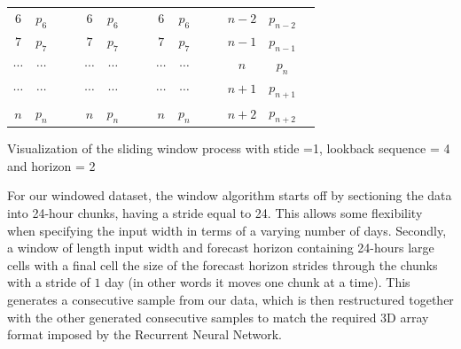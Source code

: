 \documentclass
[twocolumn,
secnumarabic,
nobibnotes,
aps,
prl,
reprint,
groupedaddress,
amsmath,
amssymb,
]{revtex4-2}
\begin{document}
\begin{center}
\begin{tabular}{|c|c|cc|c|c|cc|c|c|cc|c|c|c}
    $6$        & $p_6$                         &                &  & $6$        & \cellcolor[HTML]{EB7D7D}$p_6$ &                &  & $6$        & \cellcolor[HTML]{EB7D7D}$p_6$ &       &  & ${n-2}$    & \cellcolor[HTML]{C0C0C0}$p_{n-2}$ &       \\ \cline{1-2} \cline{5-6} \cline{9-10} \cline{13-14}
    $7$        & $p_7$                         &                &  & $7$        & $p_7$                         &                &  & $7$        & \cellcolor[HTML]{EB7D7D}$p_7$ &                &  & ${n-1}$    & \cellcolor[HTML]{C0C0C0}$p_{n-1}$ &                \\ \cline{1-2} \cline{5-6} \cline{9-10} \cline{13-14}
    $\cdots$            & $\cdots$                             &                &  & $\cdots$            & $\cdots$                             &                &  & $\cdots$            & $\cdots$                             &                &  & ${n}$    & \cellcolor[HTML]{C0C0C0}$p_{n}$ &       \\ \cline{1-2} \cline{5-6} \cline{9-10} \cline{13-14}
    $\cdots$            & $\cdots$                             &                &  & $\cdots$            & $\cdots$                             &                &  & $\cdots$            & $\cdots$                             &                &  & ${n+1}$    & \cellcolor[HTML]{EB7D7D}$p_{n+1}$ &  \\ \cline{1-2} \cline{5-6} \cline{9-10} \cline{13-14}
    $n$        & $p_n$                         &                &  & $n$        & $p_n$                         &                &  & $n$        & $p_n$                         &                &  & $n+2$        & \cellcolor[HTML]{EB7D7D}$p_{n+2}$     &                \\ \cline{1-2} \cline{5-6} \cline{9-10} \cline{13-14}
  \end{tabular}
  \begin{table}[!h]
    \caption{Visualization of the sliding window process with stide =1, lookback sequence = 4 and horizon = 2}
    \label{tab:sliding_window}
  \end{table}
\end{center}



For our windowed dataset, the window algorithm starts off by sectioning the data into 24-hour chunks, having a stride equal to 24. This allows some flexibility when specifying the input width in terms of a varying number of days. Secondly, a window of length input width and forecast horizon containing 24-hours large cells with a final cell the size of the forecast horizon strides through the chunks with a stride of $1$ day (in other words it moves one chunk at a time). This generates a consecutive sample from our data, which is then restructured together with the other generated consecutive samples to match the required 3D array format imposed by the Recurrent Neural Network.
\end{document}
